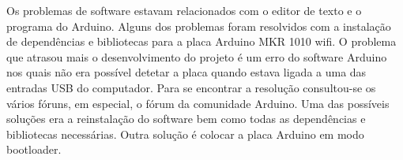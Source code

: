 \documentclass[conference]{IEEEtran}
\begin{document}
Os problemas de software estavam relacionados com o editor de texto e o programa do Arduino. Alguns dos problemas 
foram resolvidos com a instalação de dependências e bibliotecas para a placa Arduino MKR 1010 wifi. 
O problema que atrasou mais o desenvolvimento do projeto é um erro do software Arduino nos quais não era possível 
detetar a placa quando estava ligada a uma das entradas USB do computador. Para se encontrar a resolução 
consultou-se os vários fóruns, em especial, o fórum da comunidade Arduino. Uma das possíveis soluções era a 
reinstalação do software bem como todas as dependências e bibliotecas necessárias. Outra solução é colocar a 
placa Arduino em modo bootloader. \cite{arduinoport}



\end{document}
